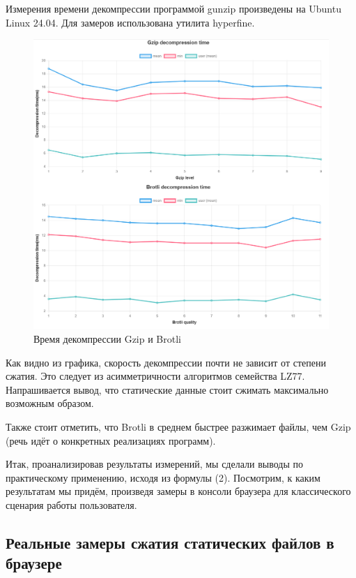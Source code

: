 \documentclass[12pt]{article}
\begin{document}
Измерения времени декомпрессии программой gunzip произведены на Ubuntu Linux 24.04. Для замеров использована утилита hyperfine.

\begin{figure}[H]
    \centering
    \includegraphics[width=1\textwidth]{../images/Decompression_time.png}
    \caption{Время декомпрессии Gzip и Brotli}
    \label{fig:decompression}
\end{figure}

Как видно из графика, скорость декомпрессии почти не зависит от степени сжатия. Это следует из асимметричности алгоритмов семейства LZ77.
Напрашивается вывод, что статические данные стоит сжимать максимально возможным образом.

Также стоит отметить, что Brotli в среднем быстрее разжимает файлы, чем Gzip (речь идёт о конкретных реализациях программ).

Итак, проанализировав результаты измерений, мы сделали выводы по практическому применению,
исходя из формулы (2). Посмотрим, к каким результатам мы придём, произведя замеры в консоли браузера для классического сценария работы пользователя.

\subsection{Реальные замеры сжатия статических файлов в браузере}
\end{document}
